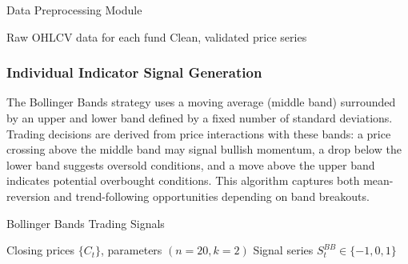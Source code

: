 \begin{breakablealgorithm}
\caption{Data Preprocessing Module}
\begin{algorithmic}[1]
\Require Raw OHLCV data for each fund
\Ensure Clean, validated price series
\end{algorithmic}
\end{breakablealgorithm}

\subsubsection{Individual Indicator Signal Generation}

The Bollinger Bands strategy uses a moving average (middle band) surrounded by an upper and lower band defined by a fixed number of standard deviations. Trading decisions are derived from price interactions with these bands: a price crossing above the middle band may signal bullish momentum, a drop below the lower band suggests oversold conditions, and a move above the upper band indicates potential overbought conditions. This algorithm captures both mean-reversion and trend-following opportunities depending on band breakouts.

\begin{breakablealgorithm}
\caption{Bollinger Bands Trading Signals}
\begin{algorithmic}[1]
\Require Closing prices $\{C_t\}$, parameters $(n=20, k=2)$
\Ensure Signal series $S^{BB}_t \in \{-1, 0, 1\}$
    \Else
    \EndIf
\EndFor
{}
\end{algorithmic}
\end{breakablealgorithm}

